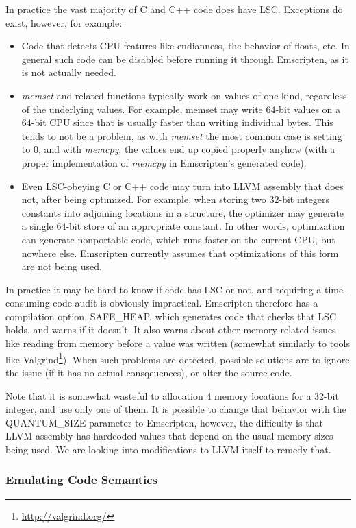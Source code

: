\documentclass[preprint,10pt]{sigplanconf}
\begin{document}
In practice the vast majority of C and C++ code does have LSC. Exceptions
do exist, however, for example:
\begin{itemize}
\item Code that detects CPU features like endianness, the behavior of floats, etc. In general such code can be disabled
      before running it through Emscripten, as it is not actually needed.
\item \emph{memset} and related functions typically work on values of one kind,
      regardless of the underlying values. For example, memset may write 64-bit
      values on a 64-bit CPU since that is usually faster than writing individual
      bytes. This tends to
      not be a problem, as with \emph{memset} the most common case is setting to
      0, and with \emph{memcpy}, the values end up copied properly anyhow (with
      a proper implementation of \emph{memcpy} in Emscripten's generated code).
\item Even LSC-obeying C or C++ code may turn into LLVM assembly that does not,
      after being optimized. For example, when storing two 32-bit integers constants into
      adjoining locations in a structure, the optimizer may generate a single
      64-bit store of an appropriate constant. In other words, optimization can
      generate nonportable code, which runs faster on the current CPU, but
      nowhere else. Emscripten currently assumes that optimizations of this form
      are not being used.
\end{itemize}
In practice it may be hard to know if code has LSC or not, and requiring
a time-consuming code audit is obviously impractical. Emscripten therefore has
a compilation option, SAFE\_HEAP, which generates code that checks that LSC holds, and warns if it
doesn't. It also warns about other memory-related issues like
reading from memory before a value was written (somewhat similarly to tools
like Valgrind\footnote{\url{http://valgrind.org/}}). When such problems are detected, possible solutions are to ignore the issue (if it has no actual
consqeuences), or alter the source code.

Note that it is somewhat wasteful to allocation 4 memory locations for
a 32-bit integer, and use only one of them. It is possible to change
that behavior with the QUANTUM\_SIZE parameter to Emscripten, however,
the difficulty is that LLVM assembly has hardcoded values that depend on
the usual memory sizes being used. We are looking into modifications
to LLVM itself to remedy that.

\subsubsection{Emulating Code Semantics}
\label{sssec:realworldcode}
\end{document}
